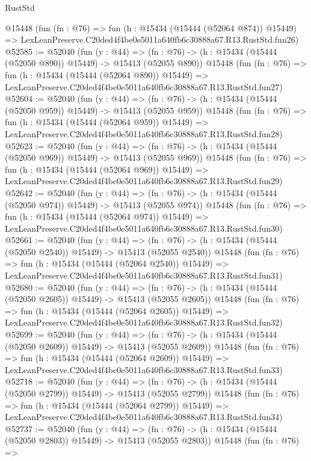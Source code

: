 \begin{lexlean}{RustStd}
\begin{coremodule}
    @15448
    (fun (fn : @76) =>
    fun (h : @15434 (@15444 (@52064 @874)) @15449) =>
    LexLeanPreserve.C20ded4f4be0e5011a640fb6c30888a67.R13.RustStd.fun26)
@52585 := @52040
    (fun (y : @44) =>
    (fn : @76) -> (h : @15434 (@15444 (@52050 @890)) @15449) -> @15413 (@52055 @890))
    @15448
    (fun (fn : @76) =>
    fun (h : @15434 (@15444 (@52064 @890)) @15449) =>
    LexLeanPreserve.C20ded4f4be0e5011a640fb6c30888a67.R13.RustStd.fun27)
@52604 := @52040
    (fun (y : @44) =>
    (fn : @76) -> (h : @15434 (@15444 (@52050 @959)) @15449) -> @15413 (@52055 @959))
    @15448
    (fun (fn : @76) =>
    fun (h : @15434 (@15444 (@52064 @959)) @15449) =>
    LexLeanPreserve.C20ded4f4be0e5011a640fb6c30888a67.R13.RustStd.fun28)
@52623 := @52040
    (fun (y : @44) =>
    (fn : @76) -> (h : @15434 (@15444 (@52050 @969)) @15449) -> @15413 (@52055 @969))
    @15448
    (fun (fn : @76) =>
    fun (h : @15434 (@15444 (@52064 @969)) @15449) =>
    LexLeanPreserve.C20ded4f4be0e5011a640fb6c30888a67.R13.RustStd.fun29)
@52642 := @52040
    (fun (y : @44) =>
    (fn : @76) -> (h : @15434 (@15444 (@52050 @974)) @15449) -> @15413 (@52055 @974))
    @15448
    (fun (fn : @76) =>
    fun (h : @15434 (@15444 (@52064 @974)) @15449) =>
    LexLeanPreserve.C20ded4f4be0e5011a640fb6c30888a67.R13.RustStd.fun30)
@52661 := @52040
    (fun (y : @44) =>
    (fn : @76) -> (h : @15434 (@15444 (@52050 @2540)) @15449) -> @15413 (@52055 @2540))
    @15448
    (fun (fn : @76) =>
    fun (h : @15434 (@15444 (@52064 @2540)) @15449) =>
    LexLeanPreserve.C20ded4f4be0e5011a640fb6c30888a67.R13.RustStd.fun31)
@52680 := @52040
    (fun (y : @44) =>
    (fn : @76) -> (h : @15434 (@15444 (@52050 @2605)) @15449) -> @15413 (@52055 @2605))
    @15448
    (fun (fn : @76) =>
    fun (h : @15434 (@15444 (@52064 @2605)) @15449) =>
    LexLeanPreserve.C20ded4f4be0e5011a640fb6c30888a67.R13.RustStd.fun32)
@52699 := @52040
    (fun (y : @44) =>
    (fn : @76) -> (h : @15434 (@15444 (@52050 @2609)) @15449) -> @15413 (@52055 @2609))
    @15448
    (fun (fn : @76) =>
    fun (h : @15434 (@15444 (@52064 @2609)) @15449) =>
    LexLeanPreserve.C20ded4f4be0e5011a640fb6c30888a67.R13.RustStd.fun33)
@52718 := @52040
    (fun (y : @44) =>
    (fn : @76) -> (h : @15434 (@15444 (@52050 @2799)) @15449) -> @15413 (@52055 @2799))
    @15448
    (fun (fn : @76) =>
    fun (h : @15434 (@15444 (@52064 @2799)) @15449) =>
    LexLeanPreserve.C20ded4f4be0e5011a640fb6c30888a67.R13.RustStd.fun34)
@52737 := @52040
    (fun (y : @44) =>
    (fn : @76) -> (h : @15434 (@15444 (@52050 @2803)) @15449) -> @15413 (@52055 @2803))
    @15448
    (fun (fn : @76) =>

\end{coremodule}
\end{lexlean}
